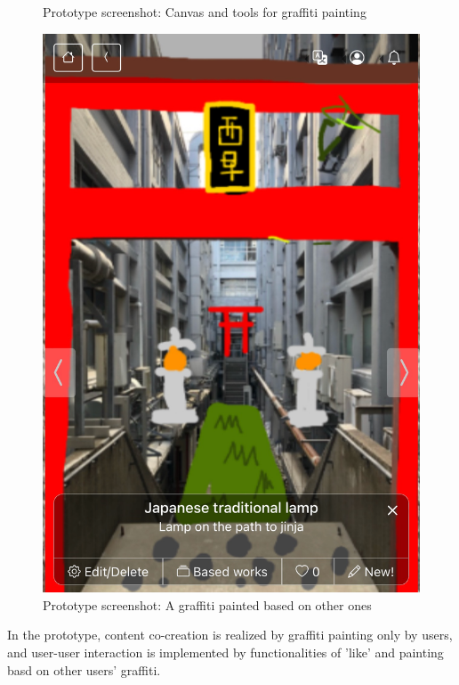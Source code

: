 \begin{figure}
\begin{minipage}{0.32\textwidth}
      \caption{Prototype screenshot: Canvas and tools for graffiti painting}
  \end{minipage}\hfill
  \begin{minipage}{0.32\textwidth}
    \centering
    \includegraphics[width=0.9\linewidth]{resources/4_methodology/prototype_based_graffiti.png}
      \caption{Prototype screenshot: A graffiti painted based on other ones}
  \end{minipage}
\end{figure}

In the prototype, content co-creation is realized by graffiti painting only by users,
and user-user interaction is implemented by functionalities of 'like' and painting basd on other users' graffiti.
